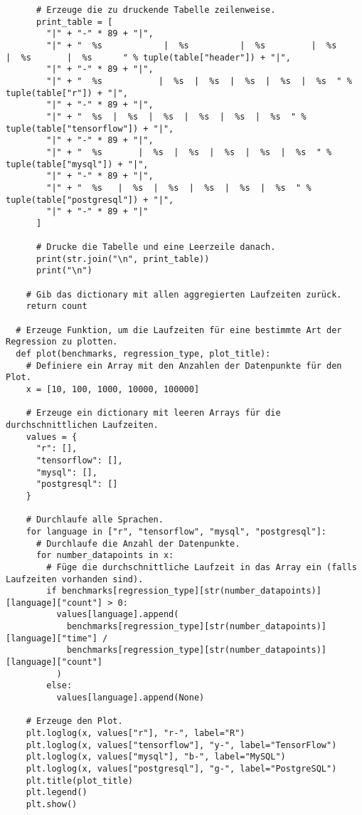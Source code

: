 \begin{verbatim}
      # Erzeuge die zu druckende Tabelle zeilenweise.
      print_table = [
        "|" + "-" * 89 + "|",
        "|" + "  %s            |  %s          |  %s         |  %s        |  %s       |  %s      " % tuple(table["header"]) + "|",
        "|" + "-" * 89 + "|",
        "|" + "  %s           |  %s  |  %s  |  %s  |  %s  |  %s  " % tuple(table["r"]) + "|",
        "|" + "-" * 89 + "|",
        "|" + "  %s  |  %s  |  %s  |  %s  |  %s  |  %s  " % tuple(table["tensorflow"]) + "|",
        "|" + "-" * 89 + "|",
        "|" + "  %s       |  %s  |  %s  |  %s  |  %s  |  %s  " % tuple(table["mysql"]) + "|",
        "|" + "-" * 89 + "|",
        "|" + "  %s   |  %s  |  %s  |  %s  |  %s  |  %s  " % tuple(table["postgresql"]) + "|",
        "|" + "-" * 89 + "|"
      ]

      # Drucke die Tabelle und eine Leerzeile danach.
      print(str.join("\n", print_table))
      print("\n")

    # Gib das dictionary mit allen aggregierten Laufzeiten zurück.
    return count

  # Erzeuge Funktion, um die Laufzeiten für eine bestimmte Art der Regression zu plotten.
  def plot(benchmarks, regression_type, plot_title):
    # Definiere ein Array mit den Anzahlen der Datenpunkte für den Plot.
    x = [10, 100, 1000, 10000, 100000]

    # Erzeuge ein dictionary mit leeren Arrays für die durchschnittlichen Laufzeiten.
    values = {
      "r": [],
      "tensorflow": [],
      "mysql": [],
      "postgresql": []
    }

    # Durchlaufe alle Sprachen.
    for language in ["r", "tensorflow", "mysql", "postgresql"]:
      # Durchlaufe die Anzahl der Datenpunkte.
      for number_datapoints in x:
        # Füge die durchschnittliche Laufzeit in das Array ein (falls Laufzeiten vorhanden sind).
        if benchmarks[regression_type][str(number_datapoints)][language]["count"] > 0:
          values[language].append(
            benchmarks[regression_type][str(number_datapoints)][language]["time"] /
            benchmarks[regression_type][str(number_datapoints)][language]["count"]
          )
        else:
          values[language].append(None)

    # Erzeuge den Plot.
    plt.loglog(x, values["r"], "r-", label="R")
    plt.loglog(x, values["tensorflow"], "y-", label="TensorFlow")
    plt.loglog(x, values["mysql"], "b-", label="MySQL")
    plt.loglog(x, values["postgresql"], "g-", label="PostgreSQL")
    plt.title(plot_title)
    plt.legend()
    plt.show()


\end{verbatim}
